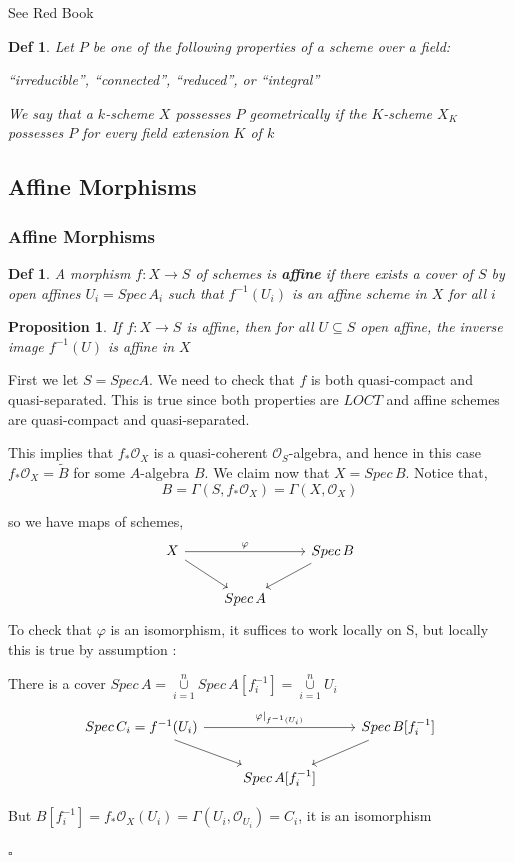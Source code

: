\documentclass{article}
\newtheorem{definition}[theorem]{Def}
\newtheorem{proposition}[theorem]{Proposition}
\newenvironment{Proof}{{\noindent \indent \it Proof:\quad}}{\hfill $\square$\par}
\begin{document}
See Red Book

\begin{definition}
Let $P$ be one of the following properties of a scheme over a field:

“irreducible”, “connected”, “reduced”, or “integral”

We say that a $k$-scheme $X$ possesses
$P$ geometrically if the $K$-scheme $X_K$ possesses $P$ for every field extension $K$ of $k$
\end{definition}


\newpage
\subsection{Affine Morphisms}

\subsubsection{Affine Morphisms}

\begin{definition}
    A morphism $f : X \to S$ of schemes is \textbf{affine} if there exists a cover of $S$ by open affines $U_i=Spec\,A_i$ such that $f^{-1}(U_i)$ is an affine scheme in $X$ for all $i$
\end{definition}

\begin{proposition}
If $f : X \to S$ is affine, then for all $U \subseteq S$ open affine, the inverse image $f^{-1}(U)$
is affine in $X$
\end{proposition}
\begin{Proof}
    First we let $S = Spec A$. We need to check that $f$ is both quasi-compact and quasi-separated.
This is true since both properties are $LOCT$ and affine schemes are quasi-compact and quasi-separated.

This implies that $f_\ast\mathcal O_X$ is a quasi-coherent $\mathcal O_S$-algebra, and hence in this case $f_\ast\mathcal O_X = \widetilde B$ for some
$A$-algebra $B$. We claim now that $X = Spec\, B$. Notice that,
$$
B = \Gamma(S, f_\ast\mathcal O_X) = \Gamma(X, \mathcal O_X)
$$

so we have maps of schemes,
\[\begin{tikzcd}
	X && {Spec\,B} \\
	& {Spec\, A}
	\arrow[from=1-1, to=2-2]
	\arrow[from=1-3, to=2-2]
	\arrow["\varphi", from=1-1, to=1-3]
\end{tikzcd}\]
To check that $\varphi$ is an isomorphism, it suffices to work locally on S, but locally this is true by assumption :

There is a cover $Spec\,A
=\mathop{\cup}\limits_{i=1}^n Spec\,A[f_i^{-1}]
=\mathop{\cup}\limits_{i=1}^n U_i$
\[\begin{tikzcd}
	{Spec\, C_i=f^{-1}(U_i)} && {Spec\,B[f_i^{-1}]} \\
	& {Spec\, A[f_i^{-1}]}
	\arrow[from=1-1, to=2-2]
	\arrow[from=1-3, to=2-2]
	\arrow["{\varphi|_{f^{-1}(U_i)}}", from=1-1, to=1-3]
\end{tikzcd}\]

But $B[f_i^{-1}]=f_\ast\mathcal O_X(U_i)=\Gamma(U_i,\mathcal O_{U_i})=C_i$, it is an isomorphism

\end{Proof}
\end{document}
